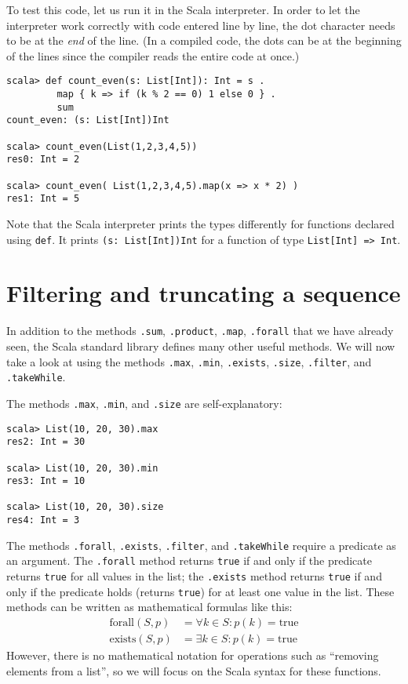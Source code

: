 To test this code, let us run it in the Scala interpreter. In order
to let the interpreter work correctly with code entered line by line,
the dot character needs to be at the \emph{end} of the line. (In a
compiled code, the dots can be at the beginning of the lines since
the compiler reads the entire code at once.)
\begin{lstlisting}
scala> def count_even(s: List[Int]): Int = s .
         map { k => if (k % 2 == 0) 1 else 0 } .
         sum
count_even: (s: List[Int])Int

scala> count_even(List(1,2,3,4,5))
res0: Int = 2

scala> count_even( List(1,2,3,4,5).map(x => x * 2) )
res1: Int = 5
\end{lstlisting}
Note that the Scala interpreter prints the types differently for functions
declared using \lstinline!def!. It prints \lstinline!(s: List[Int])Int!
for a function of type \lstinline!List[Int] => Int!.

\section{Filtering and truncating a sequence }

In addition to the methods \lstinline!.sum!, \lstinline!.product!,
\lstinline!.map!, \texttt{}\lstinline!.forall! that we have already
seen, the Scala standard library defines many other useful methods.
We will now take a look at using the methods \lstinline!.max!, \lstinline!.min!,
\lstinline!.exists!, \lstinline!.size!, \lstinline!.filter!, and
\lstinline!.takeWhile!. 

The methods \lstinline!.max!, \lstinline!.min!, and \texttt{}\lstinline!.size!
are self-explanatory:
\begin{lstlisting}
scala> List(10, 20, 30).max
res2: Int = 30

scala> List(10, 20, 30).min
res3: Int = 10

scala> List(10, 20, 30).size
res4: Int = 3
\end{lstlisting}

The methods \lstinline!.forall!, \lstinline!.exists!, \lstinline!.filter!,
and \texttt{}\lstinline!.takeWhile! require a predicate as an argument.
The \texttt{}\lstinline!.forall! method returns \texttt{}\lstinline!true!
if and only if the predicate returns \lstinline!true! for all values
in the list; the \texttt{}\lstinline!.exists! method returns \texttt{}\lstinline!true!
if and only if the predicate holds (returns \lstinline!true!) for
at least one value in the list. These methods can be written as mathematical
formulas like this:
\begin{align*}
\text{forall}\left(S,p\right) & =\forall k\in S:p(k)=\text{true}\\
\text{exists}\left(S,p\right) & =\exists k\in S:p(k)=\text{true}
\end{align*}
However, there is no mathematical notation for operations such as
``removing elements from a list'', so we will focus on the Scala
syntax for these functions.

